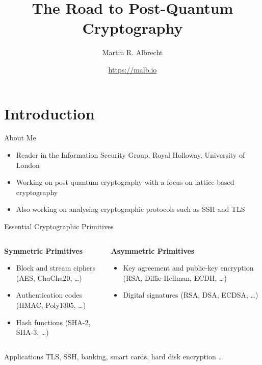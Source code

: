 \documentclass[xcolor=table,10pt,aspectratio=169]{beamer}
\author{Martin R. Albrecht}
\date{\url{https://malb.io}}
\title{The Road to Post-Quantum Cryptography}
\begin{document}
\maketitle

\section{Introduction}
\label{sec:org96455c9}

\begin{frame}[label={sec:org63d07b9}]{About Me}
\begin{itemize}
\item Reader in the Information Security Group, Royal Holloway, University of London
\item Working on post-quantum cryptography with a focus on lattice-based cryptography 
\item Also working on analysing cryptographic protocols such as SSH  and TLS  
\end{itemize}
\end{frame}

\begin{frame}[label={sec:orgbc040a7}]{Essential Cryptographic Primitives}
\begin{columns}[t]
\begin{column}{0.5\columnwidth}
\textbf{Symmetric Primitives}

\small

\begin{itemize}
\item Block and stream ciphers (AES, ChaCha20, \ldots)
\item Authentication codes (HMAC, Poly1305, \ldots)
\item Hash functions (SHA-2, SHA-3, \ldots)
\end{itemize}
\end{column}

\begin{column}{0.5\columnwidth}
\textbf{Asymmetric Primitives}

\small

\begin{itemize}
\item Key agreement and public-key encryption (RSA, Diffie-Hellman, ECDH, \ldots)
\item Digital signatures (RSA, DSA, ECDSA, \ldots)
\end{itemize}
\end{column}
\end{columns}

\begin{block}{Applications}
TLS, SSH, banking, smart cards, hard disk encryption …
\end{block}

\vspace{7.2em}
\end{frame}
\end{document}

